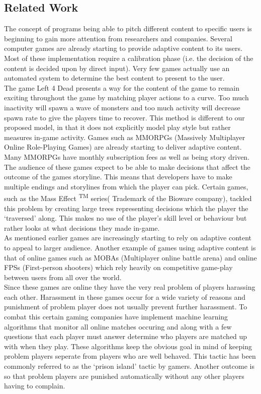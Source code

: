 \documentclass[11pt, conference, compsoc]{IEEEtran}
\begin{document}
\subsection{    Related Work}

The concept of programs being able to pitch different content to specific users is beginning to gain more attention from researchers and companies. Several computer games are already starting to provide adaptive content to its users. Most of these implementation require a calibration phase (i.e. the decision of the content is decided upon by direct input). Very few games actually use an automated system to determine the best content to present to the user.\\
The game Left 4 Dead\cite{booth2009ai} presents a way for the content of the game to remain exciting throughout the game by matching player actions to a curve. Too much inactivity will spawn a wave of monsters and too much activity will decrease spawn rate to give the players time to recover. This method is different to our proposed model, in that it does not explicitly model play style but rather measures in-game activity.
Games such as MMORPGs (Massively Multiplayer Online Role-Playing Games) are already starting to deliver adaptive content. Many MMORPGs have monthly subscription fees as well as being story driven. The audience of these games expect to be able to make decisions that affect the outcome of the games storyline. This means that developers have to make multiple endings and storylines from which the player can pick. Certain games, such as the Mass Effect \textsuperscript{TM} series( Trademark of the Bioware company), tackled this problem by creating large trees representing decisions which the player the `traversed' along. This makes no use of the player's skill level or behaviour but rather looks at what decisions they made in-game.\\
As mentioned earlier games are increasingly starting to rely on adaptive content to appeal to larger audience. Another example of games using adaptive content is that of online games such as MOBAs (Multiplayer online battle arena) and online FPSs (First-person shooters) which rely heavily on competitive game-play between users from all over the world.\\
Since these games are online they have the very real problem of players harassing each other. Harassment in these games occur for a wide variety of reasons and punishment of problem player does not usually prevent further harassment.  To combat this certain gaming companies have implement machine learning algorithms that monitor all online matches occuring and along with a few questions that each player must answer determine who players are matched up with when they play. These algorithms keep the obvious goal in mind of keeping problem players seperate from players who are well behaved. This tactic has been commonly referred to as the `prison island' tactic by gamers. Another outcome is so that problem players are punished automatically without any other players having to complain.\\
\end{document}
